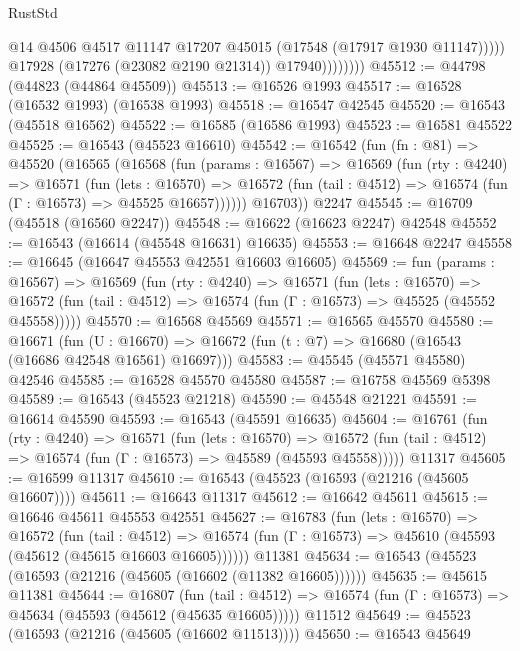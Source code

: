 \begin{lexlean}{RustStd}
\begin{coremodule}
                          @14
                          @4506
                          @4517
                          @11147
                          @17207
                          @45015
                          (@17548 (@17917 @1930 @11147)))))
                    @17928
                    (@17276 (@23082 @2190 @21314))
                    @17940))))))))
@45512 := @44798 (@44823 (@44864 @45509))
@45513 := @16526 @1993
@45517 := @16528 (@16532 @1993) (@16538 @1993)
@45518 := @16547 @42545
@45520 := @16543 (@45518 @16562)
@45522 := @16585 (@16586 @1993)
@45523 := @16581 @45522
@45525 := @16543 (@45523 @16610)
@45542 := @16542
    (fun (fn : @81) =>
    @45520
      (@16565
        (@16568
          (fun (params : @16567) =>
          @16569
            (fun (rty : @4240) =>
            @16571
              (fun (lets : @16570) =>
              @16572 (fun (tail : @4512) => @16574 (fun (Γ : @16573) => @45525 @16657))))))
        @16703))
    @2247
@45545 := @16709 (@45518 (@16560 @2247))
@45548 := @16622 (@16623 @2247) @42548
@45552 := @16543 (@16614 (@45548 @16631) @16635)
@45553 := @16648 @2247
@45558 := @16645 (@16647 @45553 @42551 @16603 @16605)
@45569 := fun (params : @16567) =>
  @16569
    (fun (rty : @4240) =>
    @16571
      (fun (lets : @16570) =>
      @16572 (fun (tail : @4512) => @16574 (fun (Γ : @16573) => @45525 (@45552 @45558)))))
@45570 := @16568 @45569
@45571 := @16565 @45570
@45580 := @16671
    (fun (U : @16670) => @16672 (fun (t : @7) => @16680 (@16543 (@16686 @42548 @16561) @16697)))
@45583 := @45545 (@45571 @45580) @42546
@45585 := @16528 @45570 @45580
@45587 := @16758 @45569 @5398
@45589 := @16543 (@45523 @21218)
@45590 := @45548 @21221
@45591 := @16614 @45590
@45593 := @16543 (@45591 @16635)
@45604 := @16761
    (fun (rty : @4240) =>
    @16571
      (fun (lets : @16570) =>
      @16572 (fun (tail : @4512) => @16574 (fun (Γ : @16573) => @45589 (@45593 @45558)))))
    @11317
@45605 := @16599 @11317
@45610 := @16543 (@45523 (@16593 (@21216 (@45605 @16607))))
@45611 := @16643 @11317
@45612 := @16642 @45611
@45615 := @16646 @45611 @45553 @42551
@45627 := @16783
    (fun (lets : @16570) =>
    @16572
      (fun (tail : @4512) =>
      @16574 (fun (Γ : @16573) => @45610 (@45593 (@45612 (@45615 @16603 @16605))))))
    @11381
@45634 := @16543 (@45523 (@16593 (@21216 (@45605 (@16602 (@11382 @16605))))))
@45635 := @45615 @11381
@45644 := @16807
    (fun (tail : @4512) => @16574 (fun (Γ : @16573) => @45634 (@45593 (@45612 (@45635 @16605)))))
    @11512
@45649 := @45523 (@16593 (@21216 (@45605 (@16602 @11513))))
@45650 := @16543 @45649

\end{coremodule}
\end{lexlean}
